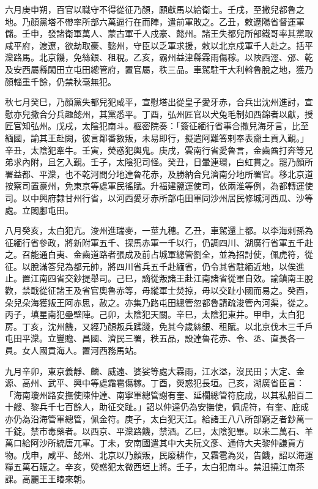 \begin{pinyinscope}
 六月庚申朔，百官以職守不得從征乃顏，願獻馬以給衛士。壬戌，至撒兒都魯之地。乃顏黨塔不帶率所部六萬逼行在而陣，遣前軍敗之。乙丑，敕遼陽省督運軍儲。壬申，發諸衛軍萬人、蒙古軍千人戍豪、懿州。諸王失都兒所部鐵哥率其黨取咸平府，渡遼，欲劫取豪、懿州，守臣以乏軍求援，敕以北京戍軍千人赴之。括平灤路馬。北京饑，免絲銀、租稅。乙亥，霸州益津縣霖雨傷稼。以陜西涇、邠、乾及安西屬縣閑田立屯田總管府，置官屬，秩三品。車駕駐干大利斡魯脫之地，獲乃顏輜重千餘，仍禁秋毫無犯。



 秋七月癸巳，乃顏黨失都兒犯咸平，宣慰塔出從皇子愛牙赤，合兵出沈州進討，宣慰亦兒撒合分兵趣懿州，其黨悉平。丁酉，弘州匠官以犬兔毛制如西錦者以獻，授匠官知弘州。戊戌，太陰犯南斗。樞密院奏：「簽征緬行省事合撒兒海牙言，比至緬國，諭其王赴闕，彼言鄰番數叛，未易即行，擬遣阿難答剌奉表齎土貢入覲。」辛丑，太陰犯牽牛。壬寅，熒惑犯輿鬼。庚戌，雲南行省愛魯言，金齒酋打奔等兄弟求內附，且乞入覲。壬子，太陰犯司怪。癸丑，日暈連環，白虹貫之。罷乃顏所署益都、平灤，也不乾河間分地達魯花赤，及勝納合兒濟南分地所署官。移北京道按察司置豪州，免東京等處軍民徭賦。升福建鹽運使司，依兩淮等例，為都轉運使司。以中興府隸甘州行省，以河西愛牙赤所部屯田軍同沙州居民修城河西瓜、沙等處。立闍鄽屯田。



 八月癸亥，太白犯亢。浚州進瑞麥，一莖九穗。乙丑，車駕還上都。以李海剌孫為征緬行省參政，將新附軍五千、探馬赤軍一千以行，仍調四川、湖廣行省軍五千赴之。召能通白夷、金齒道路者張成及前占城軍總管劉全，並為招討使，佩虎符，從征。以脫滿答兒為都元帥，將四川省兵五千赴緬省，仍令其省駐緬近地，以俟進止。置江南四省交鈔提舉司。己巳，謫從叛諸王赴江南諸省從軍自效。諭鎮南王脫歡，禁戢從征諸王及省官奧魯赤等，毋縱軍士焚掠，毋以交趾小國而易之。癸酉，朵兒朵海獲叛王阿赤思，赦之。亦集乃路屯田總管忽都魯請疏浚管內河渠，從之。丙子，填星南犯壘壁陣。己卯，太陰犯天關。辛巳，太陰犯東井。甲申，太白犯房。丁亥，沈州饑，又經乃顏叛兵蹂踐，免其今歲絲銀、租賦。以北京伐木三千戶屯田平灤。立豐贍、昌國、濟民三署，秩五品，設達魯花赤、令、丞、直長各一員。女人國貢海人。置河西務馬站。



 九月辛卯，東京義靜、麟、威遠、婆娑等處大霖雨，江水溢，沒民田；大定、金源、高州、武平、興中等處霜雹傷稼。丁酉，熒惑犯長垣。己亥，湖廣省臣言：「海南瓊州路安撫使陳仲達、南寧軍總管謝有奎、延欄總管符庇成，以其私船百二十艘、黎兵千七百餘人，助征交趾。」詔以仲達仍為安撫使，佩虎符，有奎、庇成亦仍為沿海管軍總管，佩金符。庚子，太白犯天江。給諸王八八所部窮乏者鈔萬一千錠。禁市毒藥者。以西京、平灤路饑，禁酒。乙巳，太陰犯畢。以米二萬石、羊萬口給阿沙所統唐兀軍。丁未，安南國遣其中大夫阮文彥、通侍大夫黎仲謙貢方物。戊申，咸平、懿州、北京以乃顏叛，民廢耕作，又霜雹為災，告饑，詔以海運糧五萬石賑之。辛亥，熒惑犯太微西垣上將。壬子，太白犯南斗。禁沮撓江南茶課。高麗王王睶來朝。




\end{pinyinscope}

